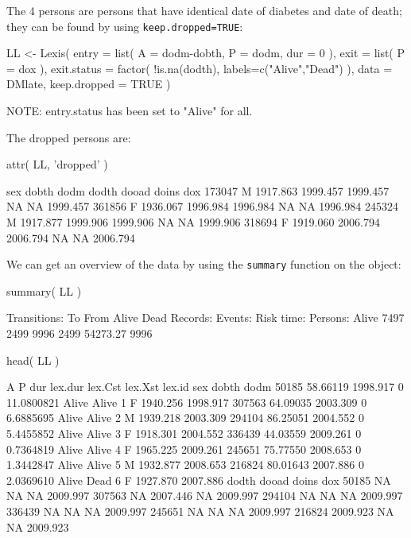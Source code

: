 \begin{enumerate}
  The 4 persons are persons that have identical date of diabetes and
  date of death; they can be found by using \texttt{keep.dropped=TRUE}:
\begin{Schunk}
\begin{Sinput}
 LL <- Lexis( entry = list( A = dodm-dobth,
                            P = dodm,
                          dur = 0 ),
               exit = list( P = dox ),
        exit.status = factor( !is.na(dodth),
                              labels=c("Alive","Dead") ),
               data = DMlate,
       keep.dropped = TRUE )
\end{Sinput}
\begin{Soutput}
NOTE: entry.status has been set to "Alive" for all.
\end{Soutput}
\end{Schunk}
  The dropped persons are:
\begin{Schunk}
\begin{Sinput}
 attr( LL, 'dropped' )
\end{Sinput}
\begin{Soutput}
       sex    dobth     dodm    dodth dooad doins      dox
173047   M 1917.863 1999.457 1999.457    NA    NA 1999.457
361856   F 1936.067 1996.984 1996.984    NA    NA 1996.984
245324   M 1917.877 1999.906 1999.906    NA    NA 1999.906
318694   F 1919.060 2006.794 2006.794    NA    NA 2006.794
\end{Soutput}
\end{Schunk}
  We can get an overview of the data by using the \texttt{summary}
  function on the object:
\begin{Schunk}
\begin{Sinput}
 summary( LL )
\end{Sinput}
\begin{Soutput}
Transitions:
     To
From    Alive Dead  Records:  Events: Risk time:  Persons:
  Alive  7497 2499      9996     2499   54273.27      9996
\end{Soutput}
\begin{Sinput}
 head( LL )
\end{Sinput}
\begin{Soutput}
              A        P dur    lex.dur lex.Cst lex.Xst lex.id sex    dobth     dodm
50185  58.66119 1998.917   0 11.0800821   Alive   Alive      1   F 1940.256 1998.917
307563 64.09035 2003.309   0  6.6885695   Alive   Alive      2   M 1939.218 2003.309
294104 86.25051 2004.552   0  5.4455852   Alive   Alive      3   F 1918.301 2004.552
336439 44.03559 2009.261   0  0.7364819   Alive   Alive      4   F 1965.225 2009.261
245651 75.77550 2008.653   0  1.3442847   Alive   Alive      5   M 1932.877 2008.653
216824 80.01643 2007.886   0  2.0369610   Alive    Dead      6   F 1927.870 2007.886
          dodth    dooad doins      dox
50185        NA       NA    NA 2009.997
307563       NA 2007.446    NA 2009.997
294104       NA       NA    NA 2009.997
336439       NA       NA    NA 2009.997
245651       NA       NA    NA 2009.997
216824 2009.923       NA    NA 2009.923
\end{Soutput}
\end{Schunk}



\end{enumerate}
